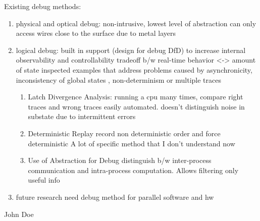 \documentclass[conference]{IEEEtran}
\begin{document}
\begin{itemize}
\begin {enumerate}
			\end{enumerate}
		Existing debug methods:
			\begin {enumerate}
			\item physical and optical debug: non-intrusive, lowest level of abstraction
			 	can only access wires close to the surface due to metal layers
			\item logical debug: built in support (design for debug DfD) to increase internal observability and controllability
			 	tradeoff b/w real-time behavior <-> amount of state inspected
			 	examples that address problems caused by asynchronicity, inconsistency of global states , non-determinism or multiple traces
					\begin {enumerate}
			 		\item Latch Divergence Analysis: running a cpu many times, compare right traces and wrong traces
			 			easily automated. doesn't distinguish noise in substate due to intermittent errors
			 		\item Deterministic Replay
			 			record non deterministic order and force deterministic
			 			A lot of specific method that I don't understand now
			 		\item Use of Abstraction for Debug
			 			distinguish b/w inter-process communication and intra-process computation. Allows filtering only useful info
					\end{enumerate}
			\item future research need
				debug method for parallel software and hw
			 \end{enumerate}	 	
\end{itemize}		
\ifCLASSOPTIONcaptionsoff
  \newpage
\fi






\begin{IEEEbiography}{John Doe}
\blindtext
\end{IEEEbiography}
\end{document}
